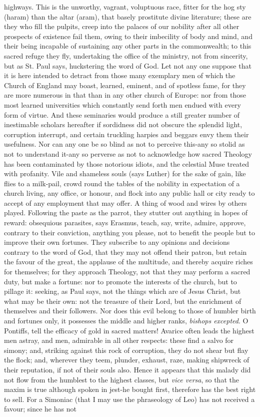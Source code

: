 highways. This is the unworthy, vagrant, voluptuous race, fitter for the hog sty (haram) than the altar (aram), that basely prostitute divine literature; these are they who fill the pulpits, creep into the palaces of our nobility after all other prospects of existence fail them, owing to their imbecility of body and mind, and their being incapable of sustaining any other parts in the commonwealth; to this sacred refuge they fly, undertaking the office of the ministry, not from sincerity, but as St. Paul says, huckstering the word of God. Let not any one suppose that it is here intended to detract from those many exemplary men of which the Church of England may boast, learned, eminent, and of spotless fame, for they are more numerous in that than in any other church of Europe: nor from those most learned universities which constantly send forth men endued with every form of virtue. And these seminaries would produce a still greater number of inestimable scholars hereafter if sordidness did not obscure the splendid light, corruption interrupt, and certain truckling harpies and beggars envy them their usefulness. Nor can any one be so blind as not to perceive this-any so stolid as not to understand it-any so perverse as not to acknowledge how sacred Theology has been contaminated by those notorious idiots, and the celestial Muse treated with profanity. Vile and shameless souls (says Luther) for the sake of gain, like flies to a milk-pail, crowd round the tables of the nobility in expectation of a church living, any office, or honour, and flock into any public hall or city ready to accept of any employment that may offer. A thing of wood and wires by others played. Following the paste as the parrot, they stutter out anything in hopes of reward: obsequious parasites, says Erasmus, teach, say, write, admire, approve, contrary to their conviction, anything you please, not to benefit the people but to improve their own fortunes. They subscribe to any opinions and decisions contrary to the word of God, that they may not offend their patron, but retain the favour of the great, the applause of the multitude, and thereby acquire riches for themselves; for they approach Theology, not that they may perform a sacred duty, but make a fortune: nor to promote the interests of the church, but to pillage it: seeking, as Paul says, not the things which are of Jesus Christ, but what may be their own: not the treasure of their Lord, but the enrichment of themselves and their followers. Nor does this evil belong to those of humbler birth and fortunes only, it possesses the middle and higher ranks, \emph{bishops excepted}. O Pontiffs, tell the efficacy of gold in sacred matters! Avarice often leads the highest men astray, and men, admirable in all other respects: these find a salvo for simony; and, striking against this rock of corruption, they do not shear but flay the flock; and, wherever they teem, plunder, exhaust, raze, making shipwreck of their reputation, if not of their souls also. Hence it appears that this malady did not flow from the humblest to the highest classes, but \emph{vice versa}, so that the maxim is true although spoken in jest-he bought first, therefore has the best right to sell. For a Simoniac (that I may use the phraseology of Leo) has not received a favour; since he has not 